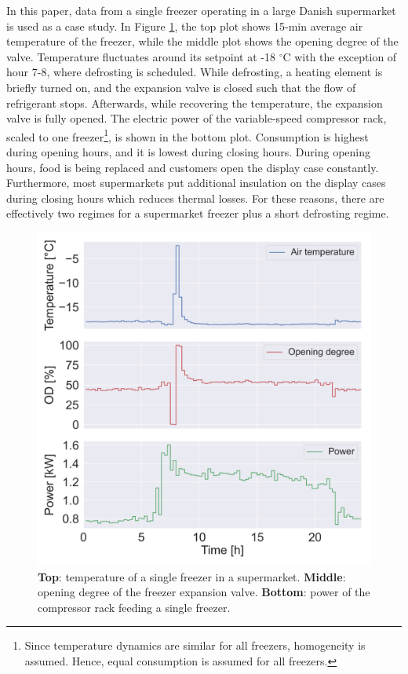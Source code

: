 In this paper, data from a single freezer operating in a large Danish supermarket is used as a case study.
In Figure \ref{fig:chunk}, the top plot shows 15-min average air temperature of the freezer, while the middle plot shows the opening degree of the valve.
Temperature fluctuates around its setpoint at -18 $^{\circ}$C with the exception of hour 7-8, where defrosting is scheduled.
While defrosting, a heating element is briefly turned on, and the expansion valve is closed such that the flow of refrigerant stops. Afterwards, while recovering the temperature, the expansion valve is fully opened.
The electric power of the variable-speed compressor rack, scaled to one freezer\footnote{Since temperature dynamics are similar for all freezers, homogeneity is assumed. Hence, equal consumption is assumed for all freezers.}, is shown in the bottom plot.
Consumption is highest during opening hours, and it is lowest during closing hours.
During opening hours, food is being replaced and customers open the display case constantly.
Furthermore, most supermarkets put additional insulation on the display cases during closing hours which reduces thermal losses.
For these reasons, there are effectively two regimes for a supermarket freezer plus a short defrosting regime.
\begin{figure}[!t]
    \centering
    \includegraphics[width=\columnwidth]{../figures/tmp_od_Pt.png}
    \caption{\textbf{Top}: temperature of a single freezer in a supermarket. \textbf{Middle}: opening degree of the freezer expansion valve. \textbf{Bottom}: power of the compressor rack feeding a single freezer.}
    \label{fig:chunk}
\end{figure}

